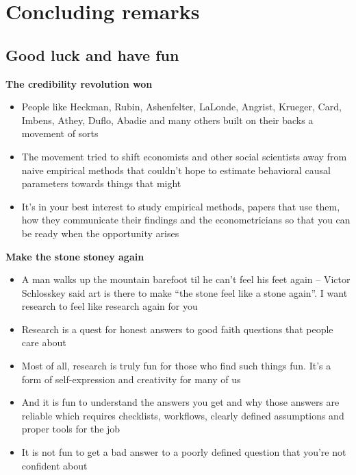 \documentclass[notes=show]{beamer}
\begin{document}
\section{Concluding remarks}

\subsection{Good luck and have fun}

\begin{frame}
\begin{center}
\textbf{The credibility revolution won}
\end{center}

\begin{itemize}
\item People like Heckman, Rubin, Ashenfelter, LaLonde, Angrist, Krueger, Card, Imbens, Athey, Duflo, Abadie and many others built on their backs a movement of sorts
\item The movement tried to shift economists and other social scientists away from naive empirical methods that couldn't hope to estimate behavioral causal parameters towards things that might
\item It's in your best interest to study empirical methods, papers that use them, how they communicate their findings and the econometricians so that you can be ready when the opportunity arises
\end{itemize}

\end{frame}


\begin{frame}[plain]
\begin{center}
\textbf{Make the stone stoney again}
\end{center}

\begin{itemize}
\item A man walks up the mountain barefoot til he can't feel his feet again -- Victor Schlosskey said art is there to make ``the stone feel like a stone again''. I want research to feel like research again for you
\item Research is a quest for honest answers to good faith questions that people care about
\item Most of all, research is truly fun for those who find such things fun.  It's a form of self-expression and creativity for many of us
\item And it is fun to understand the answers you get and why those answers are reliable which requires checklists, workflows, clearly defined assumptions and proper tools for the job
\item It is not fun to get a bad answer to a poorly defined question that you're not confident about
\end{itemize}

\end{frame}
\end{document}
